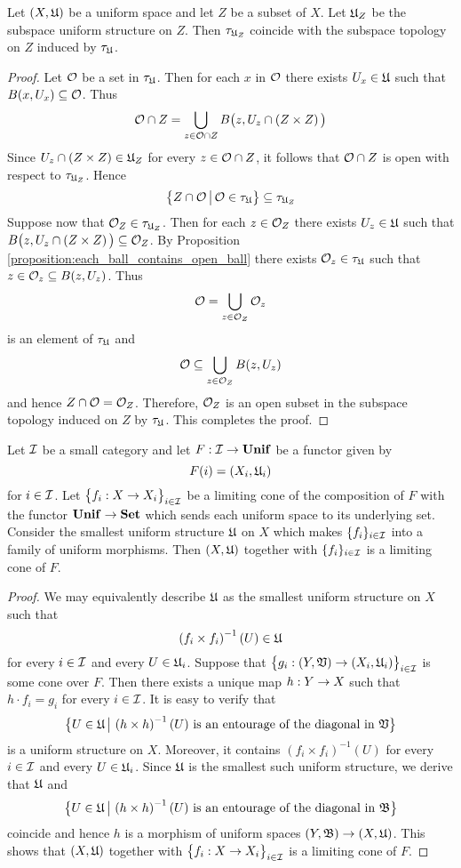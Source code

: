 \begin{proposition}\label{proposition:the_induced_topology_preserves_uniform_subspaces}
Let $(X,{\mathfrak U})$ be a uniform space and let $Z$ be a subset of $X$. Let ${\mathfrak U}_Z$ be the subspace uniform structure on $Z$. Then $\tau_{{\mathfrak U}_Z}$ coincide with the subspace topology on $Z$ induced by $\tau_{{\mathfrak U}}$.
\end{proposition}
\begin{proof}
Let ${\mathcal O}$ be a set in $\tau_{{\mathfrak U}}$. Then for each $x$ in ${\mathcal O}$ there exists $U_x\in {\mathfrak U}$ such that $B(x,U_x)\subseteq {\mathcal O}$. Thus
$${\mathcal O} \cap Z = \bigcup_{z\in {\mathcal O}\cap Z}B\big(z,U_z\cap \left(Z\times Z\right)\big)$$
Since $U_z\cap \left(Z\times Z\right) \in {\mathfrak U}_Z$ for every $z \in {\mathcal O}\cap Z$, it follows that ${\mathcal O}\cap Z$ is open with respect to $\tau_{{\mathfrak U}_Z}$. Hence
$$\big\{Z\cap {\mathcal O}\,\big|\,{\mathcal O} \in \tau_{{\mathfrak U}}\big\} \subseteq \tau_{{\mathfrak U}_Z}$$
Suppose now that ${\mathcal O}_Z \in \tau_{{\mathfrak U}_Z}$. Then for each $z\in {\mathcal O}_Z$ there exists $U_z \in {\mathfrak U}$ such that $B\big(z,U_z\cap \left(Z\times Z\right)\big)\subseteq {\mathcal O}_Z$. By Proposition \ref{proposition:each_ball_contains_open_ball} there exists ${\mathcal O}_z \in \tau_{{\mathfrak U}}$ such that $z \in {\mathcal O}_z\subseteq B(z,U_z)$. Thus 
$${\mathcal O} = \bigcup_{z \in {\mathcal O}_Z}{\mathcal O}_z$$
is an element of $\tau_{{\mathfrak U}}$ and
$${\mathcal O} \subseteq \bigcup_{z\in {\mathcal O}_Z}B(z,U_z)$$
and hence $Z\cap {\mathcal O} = {\mathcal O}_Z$. Therefore, ${\mathcal O}_Z$ is an open subset in the subspace topology induced on $Z$ by $\tau_{{\mathfrak U}}$. This completes the proof.
\end{proof}

\begin{theorem}\label{theorem:limits_of_uniform_spaces_description}
Let ${\mathcal I}$ be a small category and let $F:{\mathcal I}\rightarrow \mathbf{Unif}$ be a functor given by
$$F(i) = (X_i,{\mathfrak U}_i)$$
for $i\in {\mathcal I}$. Let $\big\{f_i:X \rightarrow X_i \big\}_{i\in {\mathcal I}}$ be a limiting cone of the composition of $F$ with the functor $\mathbf{Unif} \rightarrow \mathbf{Set}$ which sends each uniform space to its underlying set. Consider the smallest uniform structure ${\mathfrak U}$ on $X$ which makes $\{f_i\}_{i\in {\mathcal I}}$ into a family of uniform morphisms. Then $(X,{\mathfrak U})$ together with $\{f_i\}_{i\in {\mathcal I}}$ is a limiting cone of $F$.
\end{theorem}
\begin{proof}
We may equivalently describe ${\mathfrak U}$ as the smallest uniform structure on $X$ such that 
$$\left(f_i\times f_i\right)^{-1}(U) \in {\mathfrak U}$$
for every $i\in {\mathcal I}$ and every $U \in {\mathfrak U}_i$. Suppose that $\big\{g_i:(Y,{\mathfrak V}) \rightarrow (X_i,{\mathfrak U}_i)\big\}_{i\in {\mathcal I}}$ is some cone over $F$. Then there exists a unique map $h:Y \rightarrow X$ such that $h\cdot f_i = g_i$ for every $i\in {\mathcal I}$. It is easy to verify that
$$\big\{U\in {\mathfrak U}\,\big|\,\left(h\times h\right)^{-1}(U)\mbox{ is an entourage of the diagonal in }{\mathfrak V}\big\}$$
is a uniform structure on $X$. Moreover, it contains $\left(f_i\times f_i\right)^{-1}(U)$ for every $i\in {\mathcal I}$ and every $U \in {\mathfrak U}_i$. Since ${\mathfrak U}$ is the smallest such uniform structure, we derive that ${\mathfrak U}$ and
$$\big\{U\in {\mathfrak U}\,\big|\,\left(h\times h\right)^{-1}(U)\mbox{ is an entourage of the diagonal in }{\mathfrak B}\big\}$$
coincide and hence $h$ is a morphism of uniform spaces $\left(Y,{\mathfrak B}\right) \rightarrow \left(X,{\mathfrak U}\right)$. This shows that $(X,{\mathfrak U})$ together with $\big\{f_i:X \rightarrow X_i\big\}_{i\in {\mathcal I}}$ is a limiting cone of $F$.
\end{proof}

